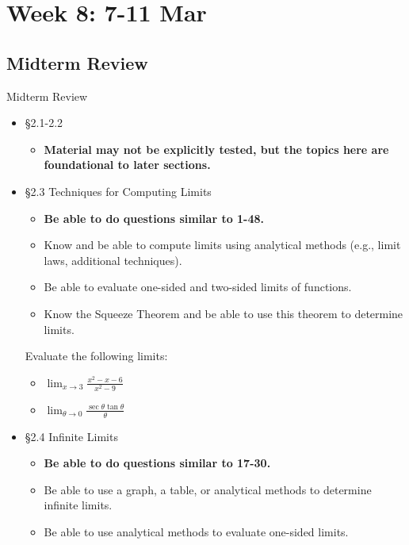 \documentclass[cal1spr16Lectures.tex]{subfiles}
\begin{document}
\section[Week 8]{Week 8: 7-11 Mar}

\subsection{Midterm Review}

\begin{frame}[allowframebreaks]{Midterm Review}\footnotesize
\begin{itemize}
\item \S 2.1-2.2 
	\begin{itemize}\footnotesize
	\item {\bf Material may not be explicitly tested, but the topics here are foundational to later sections.}
	\end{itemize}
\item \S 2.3 Techniques for Computing Limits
	\begin{itemize}\footnotesize
	\item {\bf Be able to do questions similar to 1-48.}
	\item Know and be able to compute limits using analytical methods (e.g., limit laws, additional techniques).
	\item Be able to evaluate one-sided and two-sided limits of functions.
	\item Know the Squeeze Theorem and be able to use this theorem to determine limits.
	\end{itemize}
\framebreak
\begin{exe} Evaluate the following limits:
\begin{itemize}
\item $\displaystyle\lim_{x\to 3}\frac{x^2-x-6}{x^2-9}$
\item $\displaystyle\lim_{\theta\to 0}\frac{\sec\theta\tan\theta}{\theta}$
\end{itemize}
\end{exe}
%
\framebreak
\item \S 2.4 Infinite Limits
	\begin{itemize}\footnotesize
	\item {\bf Be able to do questions similar to 17-30.}
	\item Be able to use a graph, a table, or analytical methods to determine infinite limits.
	\item Be able to use analytical methods to evaluate one-sided limits.

\end{itemize}
\end{itemize}
\end{frame}
\end{document}
